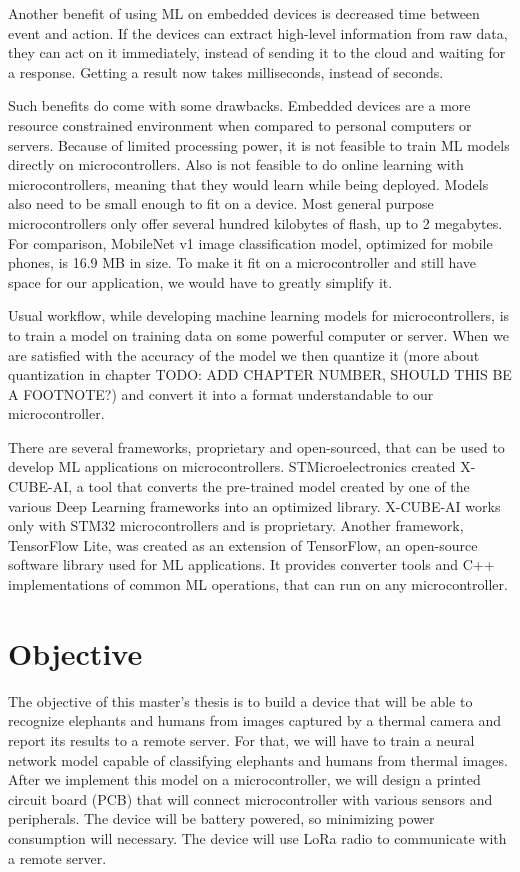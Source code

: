 Another benefit of using ML on embedded devices is decreased time between event and action.
If the devices can extract high-level information from raw data, they can act on it immediately, instead of sending it to the cloud and waiting for a response. 
Getting a result now takes milliseconds, instead of seconds.

Such benefits do come with some drawbacks.
Embedded devices are a more resource constrained environment when compared to personal computers or servers.
Because of limited processing power, it is not feasible to train ML models directly on microcontrollers.
Also is not feasible to do online learning with microcontrollers, meaning that they would learn while being deployed.
Models also need to be small enough to fit on a device. 
Most general purpose microcontrollers only offer several hundred kilobytes of flash, up to 2 megabytes.
For comparison, MobileNet v1 image classification model, optimized for mobile phones, is 16.9 MB in size\cite{daniel_edgeimpulse}.
To make it fit on a microcontroller and still have space for our application, we would have to greatly simplify it.

Usual workflow, while developing machine learning models for microcontrollers, is to train a model on training data on some powerful computer or server. 
When we are satisfied with the accuracy of the model we then quantize it (more about quantization in chapter TODO: ADD CHAPTER NUMBER, SHOULD THIS BE A FOOTNOTE?) and convert it into a format understandable to our microcontroller.

There are several frameworks, proprietary and open-sourced, that can be used to develop ML applications on microcontrollers.
STMicroelectronics created X-CUBE-AI, a tool that converts the pre-trained model created by one of the various Deep Learning frameworks into an optimized library. 
X-CUBE-AI works only with STM32 microcontrollers and is proprietary.
Another framework, TensorFlow Lite, was created as an extension of TensorFlow, an open-source software library used for ML applications.
It provides converter tools and C++ implementations of common ML operations, that can run on any microcontroller.

\section{ Objective}

The objective of this master's thesis is to build a device that will be able to recognize elephants and humans from images captured by a thermal camera and report its results to a remote server.
For that, we will have to train a neural network model capable of classifying elephants and humans from thermal images.
After we implement this model on a microcontroller, we will design a printed circuit board (PCB) that will connect microcontroller with various sensors and peripherals.
The device will be battery powered, so minimizing power consumption will necessary.
The device will use LoRa radio to communicate with a remote server.

